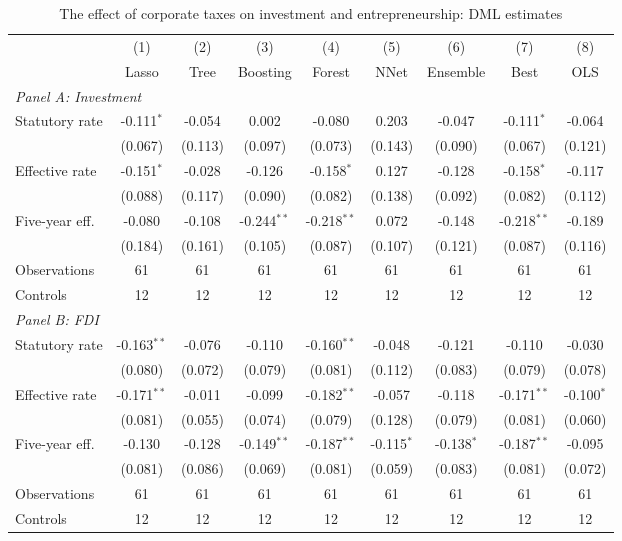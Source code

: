 \begin{table}[htbp]
\centering
\caption{The effect of corporate taxes on investment and entrepreneurship: DML estimates}
\label{tab:dml_comparison}
\small
\begin{tabular}{lcccccccc}
\toprule
 & (1) & (2) & (3) & (4) & (5) & (6) & (7) & (8) \\
 & Lasso & Tree & Boosting & Forest & NNet & Ensemble & Best & OLS \\
\midrule
\multicolumn{9}{l}{\textit{Panel A: Investment}} \\
Statutory rate & -0.111$^{*}$ & -0.054 & 0.002 & -0.080 & 0.203 & -0.047 & -0.111$^{*}$ & -0.064 \\
 & (0.067) & (0.113) & (0.097) & (0.073) & (0.143) & (0.090) & (0.067) & (0.121) \\
Effective rate & -0.151$^{*}$ & -0.028 & -0.126 & -0.158$^{*}$ & 0.127 & -0.128 & -0.158$^{*}$ & -0.117 \\
 & (0.088) & (0.117) & (0.090) & (0.082) & (0.138) & (0.092) & (0.082) & (0.112) \\
Five-year eff. & -0.080 & -0.108 & -0.244$^{**}$ & -0.218$^{**}$ & 0.072 & -0.148 & -0.218$^{**}$ & -0.189 \\
 & (0.184) & (0.161) & (0.105) & (0.087) & (0.107) & (0.121) & (0.087) & (0.116) \\
Observations & 61 & 61 & 61 & 61 & 61 & 61 & 61 & 61 \\
Controls & 12 & 12 & 12 & 12 & 12 & 12 & 12 & 12 \\
\midrule
\multicolumn{9}{l}{\textit{Panel B: FDI}} \\
Statutory rate & -0.163$^{**}$ & -0.076 & -0.110 & -0.160$^{**}$ & -0.048 & -0.121 & -0.110 & -0.030 \\
 & (0.080) & (0.072) & (0.079) & (0.081) & (0.112) & (0.083) & (0.079) & (0.078) \\
Effective rate & -0.171$^{**}$ & -0.011 & -0.099 & -0.182$^{**}$ & -0.057 & -0.118 & -0.171$^{**}$ & -0.100$^{*}$ \\
 & (0.081) & (0.055) & (0.074) & (0.079) & (0.128) & (0.079) & (0.081) & (0.060) \\
Five-year eff. & -0.130 & -0.128 & -0.149$^{**}$ & -0.187$^{**}$ & -0.115$^{*}$ & -0.138$^{*}$ & -0.187$^{**}$ & -0.095 \\
 & (0.081) & (0.086) & (0.069) & (0.081) & (0.059) & (0.083) & (0.081) & (0.072) \\
Observations & 61 & 61 & 61 & 61 & 61 & 61 & 61 & 61 \\
Controls & 12 & 12 & 12 & 12 & 12 & 12 & 12 & 12 \\

\end{tabular}
\end{table}
